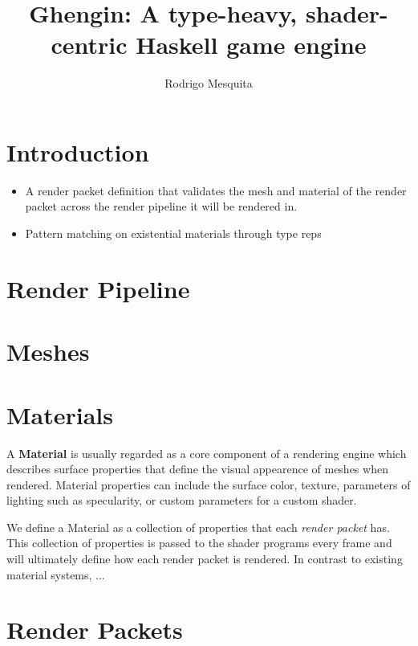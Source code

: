 \documentclass{article}
\title{Ghengin: A type-heavy, shader-centric Haskell game engine}
\author{Rodrigo Mesquita}
\begin{document}
\maketitle

\section{Introduction}

\begin{itemize}
  \item A render packet definition that validates the mesh and material of the
    render packet across the render pipeline it will be rendered in.
  \item Pattern matching on existential materials through type reps
\end{itemize}

\section{Render Pipeline}

\section{Meshes}

\section{Materials}

A \textbf{Material} is usually regarded as a core component of a rendering
engine which describes surface properties that define the visual appearence of
meshes when rendered. Material properties can include the surface color,
texture, parameters of lighting such as specularity, or custom parameters for a
custom shader.

We define a Material as a collection of properties that each \emph{render
packet} has. This collection of properties is passed to the shader programs
every frame and will ultimately define how each render packet is rendered. In
contrast to existing material systems, ...

\section{Render Packets}

\end{document}
